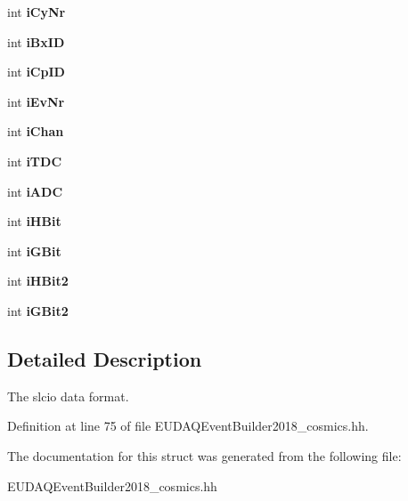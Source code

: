 \begin{DoxyCompactItemize}
\item 
int {\bfseries i\-Cy\-Nr}\label{structCALICE_1_1EUDAQEventBuilder2018__cosmics_1_1rawData_a26731a4573683d1762864b79d44537a6}

\item 
int {\bfseries i\-Bx\-I\-D}\label{structCALICE_1_1EUDAQEventBuilder2018__cosmics_1_1rawData_a52336f10191ed552d55380e3e7f33b0e}

\item 
int {\bfseries i\-Cp\-I\-D}\label{structCALICE_1_1EUDAQEventBuilder2018__cosmics_1_1rawData_adce6b5abf72e5bcbcff7908fb534fb04}

\item 
int {\bfseries i\-Ev\-Nr}\label{structCALICE_1_1EUDAQEventBuilder2018__cosmics_1_1rawData_a543148e3707cb5d6c48baa9da2cd850e}

\item 
int {\bfseries i\-Chan}\label{structCALICE_1_1EUDAQEventBuilder2018__cosmics_1_1rawData_a3e990facb75c9f8d0857340554fc50a8}

\item 
int {\bfseries i\-T\-D\-C}\label{structCALICE_1_1EUDAQEventBuilder2018__cosmics_1_1rawData_aa9c7381ef8c72646d4ddcc8bcc6c9a3d}

\item 
int {\bfseries i\-A\-D\-C}\label{structCALICE_1_1EUDAQEventBuilder2018__cosmics_1_1rawData_ac047e72373c5ddb9cb99bc4db84658d2}

\item 
int {\bfseries i\-H\-Bit}\label{structCALICE_1_1EUDAQEventBuilder2018__cosmics_1_1rawData_a98b7fbca150160baa217e8671c224a8a}

\item 
int {\bfseries i\-G\-Bit}\label{structCALICE_1_1EUDAQEventBuilder2018__cosmics_1_1rawData_aee2745acdc1816d126ac2c4baa613a60}

\item 
int {\bfseries i\-H\-Bit2}\label{structCALICE_1_1EUDAQEventBuilder2018__cosmics_1_1rawData_a273555c51f257a133ef2c88955ae5900}

\item 
int {\bfseries i\-G\-Bit2}\label{structCALICE_1_1EUDAQEventBuilder2018__cosmics_1_1rawData_af9c83e421af8b8b7c21dfa2382a0c7db}

\end{DoxyCompactItemize}


\subsection{Detailed Description}
The slcio data format. 

Definition at line 75 of file E\-U\-D\-A\-Q\-Event\-Builder2018\-\_\-cosmics.\-hh.



The documentation for this struct was generated from the following file\-:\begin{DoxyCompactItemize}
\item 
E\-U\-D\-A\-Q\-Event\-Builder2018\-\_\-cosmics.\-hh\end{DoxyCompactItemize}
